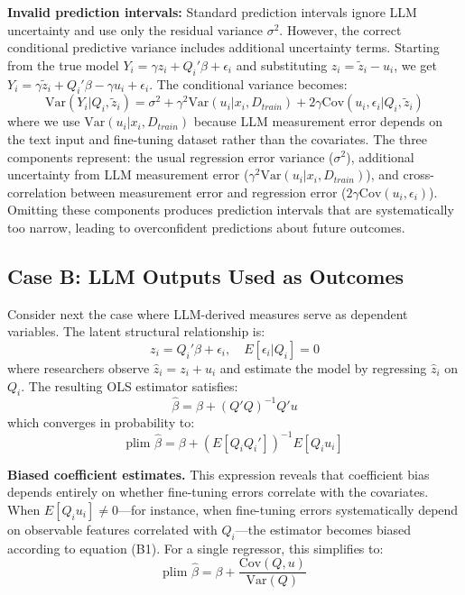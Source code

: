 \documentclass[11pt]{article}
\begin{document}
\textbf{Invalid prediction intervals:} 
Standard prediction intervals ignore LLM uncertainty and use only the residual variance $\sigma^2$. 
However, the correct conditional predictive variance includes additional uncertainty terms. 
Starting from the true model $Y_i = \gamma z_i + Q_i'\beta + \epsilon_i$ and substituting $z_i = \tilde{z}_i - u_i$, 
we get $Y_i = \gamma\tilde{z}_i + Q_i'\beta - \gamma u_i + \epsilon_i$. The conditional variance becomes:
\begin{equation}
\text{Var}(Y_i | Q_i, \tilde{z}_i) = \sigma^2 + \gamma^2\text{Var}(u_i | x_i, D_{train}) + 2\gamma \text{Cov}(u_i, \epsilon_i | Q_i, \tilde{z}_i) \tag{A3}
\end{equation}
where we use $\text{Var}(u_i | x_i, D_{train})$ because LLM measurement error depends on the text input and fine-tuning dataset rather than the covariates. 
The three components represent: the usual regression error variance ($\sigma^2$), 
additional uncertainty from LLM measurement error ($\gamma^2\text{Var}(u_i | x_i, D_{train})$), 
and cross-correlation between measurement error and regression error ($2\gamma \text{Cov}(u_i, \epsilon_i)$). 
Omitting these components produces prediction intervals that are systematically too narrow, 
leading to overconfident predictions about future outcomes.

\subsection{Case B: LLM Outputs Used as Outcomes}

Consider next the case where LLM-derived measures serve as dependent variables. The latent structural relationship is:
\begin{equation}
z_i = Q_i'\beta + \epsilon_i, \quad E[\epsilon_i | Q_i] = 0
\end{equation}
where researchers observe $\hat{z}_i = z_i + u_i$ and estimate the model by regressing $\hat{z}_i$ on $Q_i$. The resulting OLS estimator satisfies:
\begin{equation}
\hat{\beta} = \beta + (Q'Q)^{-1}Q'u
\end{equation}
which converges in probability to:
\begin{equation}
\text{plim } \hat{\beta} = \beta + (E[Q_i Q_i'])^{-1} E[Q_i u_i] \tag{B1}
\end{equation}

\textbf{Biased coefficient estimates.} This expression reveals that coefficient bias depends entirely on whether fine-tuning errors correlate with the covariates. When $E[Q_i u_i] \neq 0$—for instance, when fine-tuning errors systematically depend on observable features correlated with $Q_i$—the estimator becomes biased according to equation (B1). For a single regressor, this simplifies to:
\begin{equation}
\text{plim } \hat{\beta} = \beta + \frac{\text{Cov}(Q, u)}{\text{Var}(Q)} \tag{B2}
\end{equation}
\end{document}

